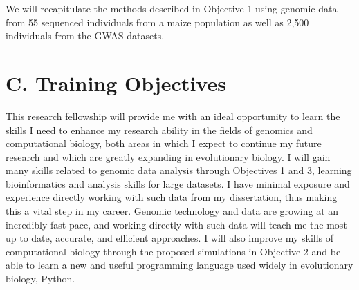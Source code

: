 We will recapitulate the methods described in Objective 1 using genomic data from 55 sequenced individuals from a maize population as well as 2,500 individuals from the GWAS datasets.

	
	
	
	
	
	
	
	
\section*{C. Training Objectives}

This research fellowship will provide me with an ideal opportunity to learn the skills I need to enhance my research ability in the fields of genomics and computational biology, both areas in which I expect to continue my future research and which are greatly expanding in evolutionary biology. I will gain many skills related to genomic data analysis through Objectives 1 and 3, learning bioinformatics and analysis skills for large datasets. I have minimal exposure and experience directly working with such data from my dissertation, thus making this a vital step in my career. Genomic technology and data are growing at an incredibly fast pace, and working directly with such data will teach me the most up to date, accurate, and efficient approaches. I will also improve my skills of computational biology through the proposed simulations in Objective 2 and be able to learn a new and useful programming language used widely in evolutionary biology, Python. 


